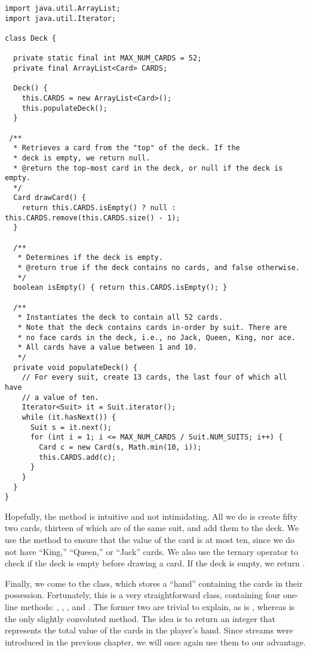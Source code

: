 \begin{lstlisting}[language=MyJava]
import java.util.ArrayList;
import java.util.Iterator;

class Deck {

  private static final int MAX_NUM_CARDS = 52;
  private final ArrayList<Card> CARDS;

  Deck() {
    this.CARDS = new ArrayList<Card>();
    this.populateDeck();
  }

 /**
  * Retrieves a card from the "top" of the deck. If the
  * deck is empty, we return null.
  * @return the top-most card in the deck, or null if the deck is empty.
  */
  Card drawCard() {
    return this.CARDS.isEmpty() ? null : this.CARDS.remove(this.CARDS.size() - 1);
  }

  /**
   * Determines if the deck is empty.
   * @return true if the deck contains no cards, and false otherwise.
   */
  boolean isEmpty() { return this.CARDS.isEmpty(); }

  /**
   * Instantiates the deck to contain all 52 cards.
   * Note that the deck contains cards in-order by suit. There are 
   * no face cards in the deck, i.e., no Jack, Queen, King, nor ace.
   * All cards have a value between 1 and 10.
   */
  private void populateDeck() {
    // For every suit, create 13 cards, the last four of which all have
    // a value of ten.
    Iterator<Suit> it = Suit.iterator();
    while (it.hasNext()) {
      Suit s = it.next();
      for (int i = 1; i <= MAX_NUM_CARDS / Suit.NUM_SUITS; i++) {
        Card c = new Card(s, Math.min(10, i));
        this.CARDS.add(c);
      }
    }
  }
}
\end{lstlisting}

Hopefully, the  method is intuitive and not intimidating. 
All we do is create fifty two cards, thirteen of which are of the same suit, and add them to the deck.
We use the  method to ensure that the value of the card is at most ten, since we do not have ``King,'' ``Queen,'' or ``Jack'' cards. 
We also use the ternary operator to check if the deck is empty before drawing a card. 
If the deck is empty, we return .

Finally, we come to the  class, which stores a ``hand'' containing the cards in their possession. 
Fortunately, this is a very straightforward class, containing four one-line methods: , , , and . 
The former two are trivial to explain, as is , whereas  is the only slightly convoluted method. 
The idea is to return an integer that represents the total value of the cards in the player's hand. 
Since streams were introduced in the previous chapter, we will once again use them to our advantage.

